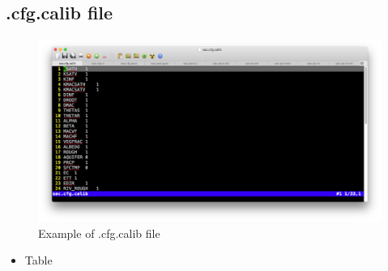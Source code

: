 \documentclass[]{scrbook}
\providecommand{\tightlist}{%
  \setlength{\itemsep}{0pt}\setlength{\parskip}{0pt}}
\begin{document}
\subsection{.cfg.calib file}\label{cfg.calib-file}

\begin{figure}
\centering
\includegraphics{Fig/IO/cfg.calib.png}
\caption{Example of .cfg.calib file}
\end{figure}

\begin{itemize}
\tightlist
\item
  Table
\end{itemize}
\end{document}
